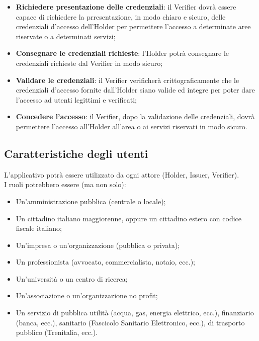 \begin{itemize}
    \item \textbf{Richiedere presentazione delle credenziali}: il Verifier dovrà essere capace di richiedere la prresentazione, in modo chiaro e sicuro, delle credenziali d’accesso dell’Holder per permettere l’accesso a determinate aree riservate o a determinati servizi;
    \item \textbf{Consegnare le credenziali richieste}: l’Holder potrà consegnare le credenziali richieste dal Verifier in modo sicuro;
    \item \textbf{Validare le credenziali}: il Verifier verificherà crittograficamente che le credenziali d’accesso fornite dall’Holder siano valide ed integre per poter dare l’accesso ad utenti legittimi e verificati;
    \item \textbf{Concedere l'accesso}: il Verifier, dopo la validazione delle credenziali, dovrà permettere l’accesso all’Holder all’area o ai servizi riservati in modo sicuro.
\end{itemize}

\subsection{Caratteristiche degli utenti}
L’applicativo potrà essere utilizzato da ogni attore (Holder, Issuer, Verifier). \\
I ruoli potrebbero essere (ma non solo): 
\begin{itemize}
    \item Un’amministrazione pubblica (centrale o locale);
    \item Un cittadino italiano maggiorenne, oppure un cittadino estero con codice fiscale italiano;
    \item Un’impresa o un’organizzazione (pubblica o privata);
    \item Un professionista (avvocato, commercialista, notaio, ecc.);
    \item Un’università o un centro di ricerca;
    \item Un’associazione o un’organizzazione no profit;
    \item Un servizio di pubblica utilità (acqua, gas, energia elettrico, ecc.), finanziario (banca, ecc.), sanitario (Fascicolo Sanitario Elettronico, ecc.), 
di trasporto pubblico (Trenitalia, ecc.).
\end{itemize}
